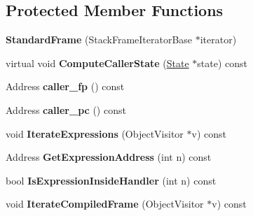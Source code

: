 \subsection*{Protected Member Functions}
\begin{DoxyCompactItemize}
\item 
\hypertarget{classv8_1_1internal_1_1_standard_frame_a3d2800d598b2aa9e6c10762caef1399c}{}{\bfseries Standard\+Frame} (Stack\+Frame\+Iterator\+Base $\ast$iterator)\label{classv8_1_1internal_1_1_standard_frame_a3d2800d598b2aa9e6c10762caef1399c}

\item 
\hypertarget{classv8_1_1internal_1_1_standard_frame_acc0856ea9ccb29eb7fed89e1dd81bf5f}{}virtual void {\bfseries Compute\+Caller\+State} (\hyperlink{classv8_1_1internal_1_1_state}{State} $\ast$state) const \label{classv8_1_1internal_1_1_standard_frame_acc0856ea9ccb29eb7fed89e1dd81bf5f}

\item 
\hypertarget{classv8_1_1internal_1_1_standard_frame_a85d027e8d2d3f59a4344e054cb271bef}{}Address {\bfseries caller\+\_\+fp} () const \label{classv8_1_1internal_1_1_standard_frame_a85d027e8d2d3f59a4344e054cb271bef}

\item 
\hypertarget{classv8_1_1internal_1_1_standard_frame_a46147d914bd21ce0e5cb469f7bed8263}{}Address {\bfseries caller\+\_\+pc} () const \label{classv8_1_1internal_1_1_standard_frame_a46147d914bd21ce0e5cb469f7bed8263}

\item 
\hypertarget{classv8_1_1internal_1_1_standard_frame_ae9d20f0dbf4fafe202fd61a65103d20a}{}void {\bfseries Iterate\+Expressions} (Object\+Visitor $\ast$v) const \label{classv8_1_1internal_1_1_standard_frame_ae9d20f0dbf4fafe202fd61a65103d20a}

\item 
\hypertarget{classv8_1_1internal_1_1_standard_frame_a25981494e516fce96e3638c0e1ae016b}{}Address {\bfseries Get\+Expression\+Address} (int n) const \label{classv8_1_1internal_1_1_standard_frame_a25981494e516fce96e3638c0e1ae016b}

\item 
\hypertarget{classv8_1_1internal_1_1_standard_frame_a84aad3c0efba5cf670f5c60e1c3bb619}{}bool {\bfseries Is\+Expression\+Inside\+Handler} (int n) const \label{classv8_1_1internal_1_1_standard_frame_a84aad3c0efba5cf670f5c60e1c3bb619}

\item 
\hypertarget{classv8_1_1internal_1_1_standard_frame_a84c2ea0cdd334959a56e896ed021e9ac}{}void {\bfseries Iterate\+Compiled\+Frame} (Object\+Visitor $\ast$v) const \label{classv8_1_1internal_1_1_standard_frame_a84c2ea0cdd334959a56e896ed021e9ac}

\end{DoxyCompactItemize}
